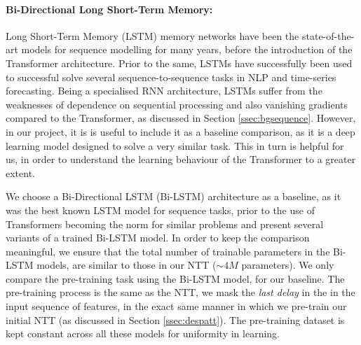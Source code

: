 \paragraph*{Bi-Directional Long Short-Term Memory: }
Long Short-Term Memory (LSTM) memory networks\cite{lstm} have been the state-of-the-art models for sequence modelling for many years, before the introduction of the Transformer architecture. Prior to the same, LSTMs have successfully been used to successful solve several sequence-to-sequence tasks in NLP and time-series forecasting. Being a specialised RNN architecture, LSTMs suffer from the weaknesses of dependence on sequential processing and also vanishing gradients compared to the Transformer, as discussed in Section \ref{ssec:bgsequence}. However, in our project, it is is useful to include it as a baseline comparison, as it is a deep learning model designed to solve a very similar task. This in turn is helpful for us, in order to understand the learning behaviour of the Transformer to a greater extent.

We choose a Bi-Directional LSTM (Bi-LSTM)\cite{bilstm} architecture as a baseline, as it was the best known LSTM model for sequence tasks, prior to the use of Transformers becoming the norm for similar problems and present several variants of a trained Bi-LSTM model. In order to keep the comparison meaningful, we ensure that the total number of trainable parameters in the Bi-LSTM models, are similar to those in our NTT (${\sim}4M$ parameters). We only compare the pre-training task using the Bi-LSTM model, for our baseline. The pre-training process is the same as the NTT, we mask the \emph{last delay} in the in the input sequence of features, in the exact same manner in which we pre-train our initial NTT (as discussed in Section \ref{ssec:despatt}). The pre-training dataset is kept constant across all these models for uniformity in learning.

